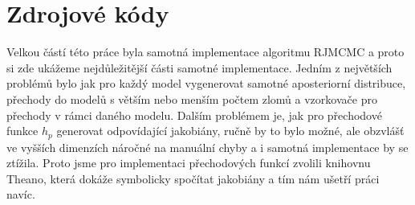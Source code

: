 \documentclass[czech,master,public,dept470,male,cpdeclaration,oneside, python]{diploma}
\begin{document}
\section{Zdrojové kódy}
Velkou částí této práce byla samotná implementace algoritmu RJMCMC a proto si zde ukážeme nejdůležitější části samotné implementace. Jedním z největších problémů bylo jak pro každý model vygenerovat samotné aposteriorní distribuce, přechody do modelů s větším nebo menším počtem zlomů a vzorkovače pro přechody v rámci daného modelu. Dalším problémem je, jak pro přechodové funkce $h_p$ generovat odpovídající jakobiány, ručně by to bylo možné, ale obzvlášť ve vyšších dimenzích náročné na manuální chyby a i samotná implementace by se ztížila. Proto jsme pro implementaci přechodových funkcí zvolili knihovnu Theano\cite{theano}, která dokáže symbolicky spočítat jakobiány a tím nám ušetří práci navíc. \par
\end{document}
